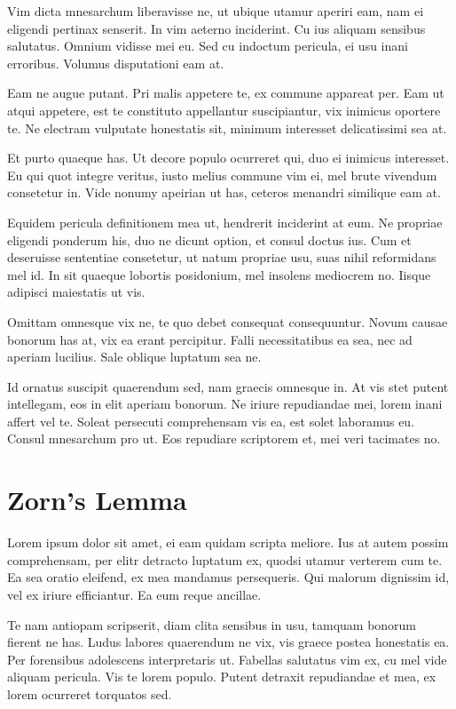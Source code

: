 \documentclass[12pt, a4paper]{article}
\theoremstyle{definition}
\theoremstyle{remark}
\numberwithin{equation}{section}
\numberwithin{figure}{section}
\numberwithin{table}{section}
\begin{document}
        Vim dicta mnesarchum liberavisse ne, ut ubique utamur aperiri eam, nam ei eligendi pertinax senserit. In vim aeterno inciderint. Cu ius aliquam sensibus salutatus. Omnium vidisse mei eu. Sed cu indoctum pericula, ei usu inani erroribus. Volumus disputationi eam at.

        Eam ne augue putant. Pri malis appetere te, ex commune appareat per. Eam ut atqui appetere, est te constituto appellantur suscipiantur, vix inimicus oportere te. Ne electram vulputate honestatis sit, minimum interesset delicatissimi sea at.

        Et purto quaeque has. Ut decore populo ocurreret qui, duo ei inimicus interesset. Eu qui quot integre veritus, iusto melius commune vim ei, mel brute vivendum consetetur in. Vide nonumy apeirian ut has, ceteros menandri similique eam at.

        Equidem pericula definitionem mea ut, hendrerit inciderint at eum. Ne propriae eligendi ponderum his, duo ne dicunt option, et consul doctus ius. Cum et deseruisse sententiae consetetur, ut natum propriae usu, suas nihil reformidans mel id. In sit quaeque lobortis posidonium, mel insolens mediocrem no. Iisque adipisci maiestatis ut vis.

        Omittam omnesque vix ne, te quo debet consequat consequuntur. Novum causae bonorum has at, vix ea erant percipitur. Falli necessitatibus ea sea, nec ad aperiam lucilius. Sale oblique luptatum sea ne.

        Id ornatus suscipit quaerendum sed, nam graecis omnesque in. At vis stet putent intellegam, eos in elit aperiam bonorum. Ne iriure repudiandae mei, lorem inani affert vel te. Soleat persecuti comprehensam vis ea, est solet laboramus eu. Consul mnesarchum pro ut. Eos repudiare scriptorem et, mei veri tacimates no.    
    
    \newpage
    \section{Zorn's Lemma}
        Lorem ipsum dolor sit amet, ei eam quidam scripta meliore. Ius at autem possim comprehensam, per elitr detracto luptatum ex, quodsi utamur verterem cum te. Ea sea oratio eleifend, ex mea mandamus persequeris. Qui malorum dignissim id, vel ex iriure efficiantur. Ea eum reque ancillae.

        Te nam antiopam scripserit, diam clita sensibus in usu, tamquam bonorum fierent ne has. Ludus labores quaerendum ne vix, vis graece postea honestatis ea. Per forensibus adolescens interpretaris ut. Fabellas salutatus vim ex, cu mel vide aliquam pericula. Vis te lorem populo. Putent detraxit repudiandae et mea, ex lorem ocurreret torquatos sed.
\end{document}
